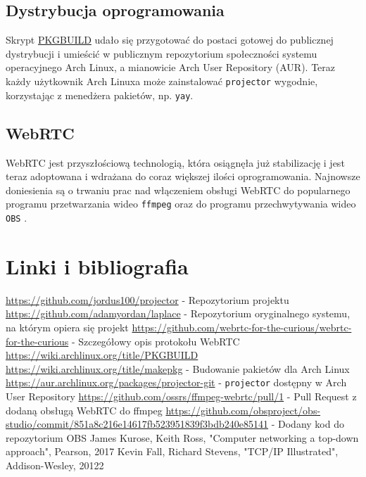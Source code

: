 \documentclass[a4paper,11pt]{article}
\begin{document}
        \subsection{Dystrybucja oprogramowania}
            Skrypt \hyperref[PKGBUILD]{PKGBUILD} udało się przygotować do postaci gotowej do publicznej dystrybucji i umieścić w publicznym repozytorium społeczności systemu operacyjnego Arch Linux, a mianowicie Arch User Repository (AUR).
            Teraz każdy użytkownik Arch Linuxa może zainstalować \texttt{projector} wygodnie, korzystając z menedżera pakietów, np. \texttt{yay}. \cite[link do repozytorium]{7}
        \subsection{WebRTC}
            WebRTC jest przyszłościową technologią, która osiągnęła już stabilizację i jest teraz adoptowana i wdrażana do coraz większej ilości oprogramowania. 
            Najnowsze doniesienia są o trwaniu prac nad włączeniem obsługi WebRTC do popularnego programu przetwarzania wideo \texttt{ffmpeg} \cite{6} oraz do programu przechwytywania wideo \texttt{OBS} \cite{7}.
    \section{Linki i bibliografia}
        \renewcommand\refname{}
        \begin{thebibliography}{9}
         \url{https://github.com/jordus100/projector} - Repozytorium projektu
         \url{https://github.com/adamyordan/laplace} - Repozytorium oryginalnego systemu, na którym opiera się projekt
         \url{https://github.com/webrtc-for-the-curious/webrtc-for-the-curious} - Szczegółowy opis protokołu WebRTC
         \url{https://wiki.archlinux.org/title/PKGBUILD} \\ \url{https://wiki.archlinux.org/title/makepkg} - Budowanie pakietów dla Arch Linux
         \url{https://aur.archlinux.org/packages/projector-git} - \texttt{projector} dostępny w Arch User Repository
         \url{https://github.com/ossrs/ffmpeg-webrtc/pull/1} - Pull Request z dodaną obsługą WebRTC do ffmpeg
         \url{https://github.com/obsproject/obs-studio/commit/851a8c216e14617fb523951839f3bdb240e85141} - Dodany kod do repozytorium OBS
         James Kurose, Keith Ross, "Computer networking a top-down approach", Pearson, 2017
         Kevin Fall, Richard Stevens, "TCP/IP Illustrated", Addison-Wesley, 20122
        \end{thebibliography}
\end{document}
